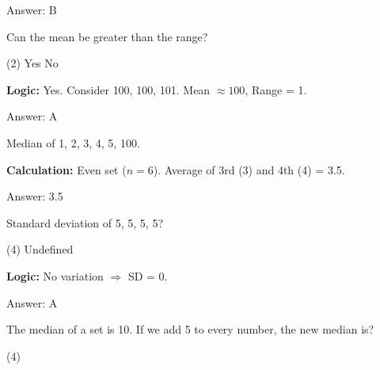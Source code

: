 \documentclass[11pt,paper=a4,answers]{exam}
\begin{document}
\begin{questions}
\begin{solution}
\vspace{30pt}

Answer: \colorbox{yellow!100}{B}
\end{solution}

\vspace{60pt}

\question
Can the mean be greater than the range?
\begin{tasks}(2)
    \task Yes
    \task No
\end{tasks}

\begin{solution}
\textbf{Logic:} Yes. Consider {100, 100, 101}. Mean $\approx 100$, Range = 1.

\vspace{30pt}

Answer: \colorbox{yellow!100}{A}
\end{solution}

\vspace{60pt}

\question
Median of {1, 2, 3, 4, 5, 100}.

\begin{solution}
\textbf{Calculation:} Even set ($n=6$). Average of 3rd (3) and 4th (4) = 3.5.

\vspace{30pt}

Answer: \colorbox{yellow!100}{3.5}
\end{solution}

\vspace{60pt}

\question
Standard deviation of {5, 5, 5, 5}?
\begin{tasks}(4)
    \task Undefined
\end{tasks}

\begin{solution}
\textbf{Logic:} No variation $\Rightarrow$ SD = 0.

\vspace{30pt}

Answer: \colorbox{yellow!100}{A}
\end{solution}

\vspace{60pt}

\question
The median of a set is 10. If we add 5 to every number, the new median is?
\begin{tasks}(4)
\end{tasks}


\end{questions}
\end{document}
